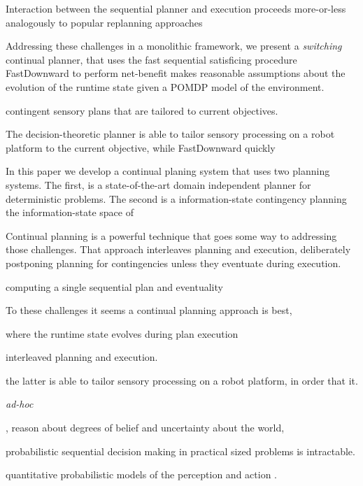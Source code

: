Interaction between the sequential planner and execution proceeds
more-or-less analogously to popular replanning approaches

Addressing these challenges in a monolithic framework, we present a
{\em switching} continual planner, that uses the fast sequential
satisficing procedure FastDownward to perform net-benefit
makes reasonable assumptions about the evolution of the runtime state
given a POMDP model of the environment. 

contingent sensory plans that are tailored to current
objectives.


The decision-theoretic planner is able to tailor sensory processing on
a robot platform to the current objective, while FastDownward  quickly 


In this paper we develop a continual planing system that uses two
planning systems. The first, is a state-of-the-art domain independent
planner for deterministic problems. The second is a information-state
contingency planning the information-state space of 


Continual planning is a powerful technique that goes some way to
addressing those challenges. That approach interleaves planning and
execution, deliberately postponing planning for contingencies unless
they eventuate during execution. 


computing a single sequential plan and
eventuality



To these challenges it seems a continual planning approach is best, 

where the runtime state evolves during plan execution 


interleaved planning and execution. 

the latter is able to tailor sensory processing on a robot platform,
in order that it.

{\em ad-hoc} 

, reason about degrees of belief and uncertainty about the world, 

probabilistic sequential decision making in practical sized problems
is intractable.

quantitative probabilistic models of the perception and action .
